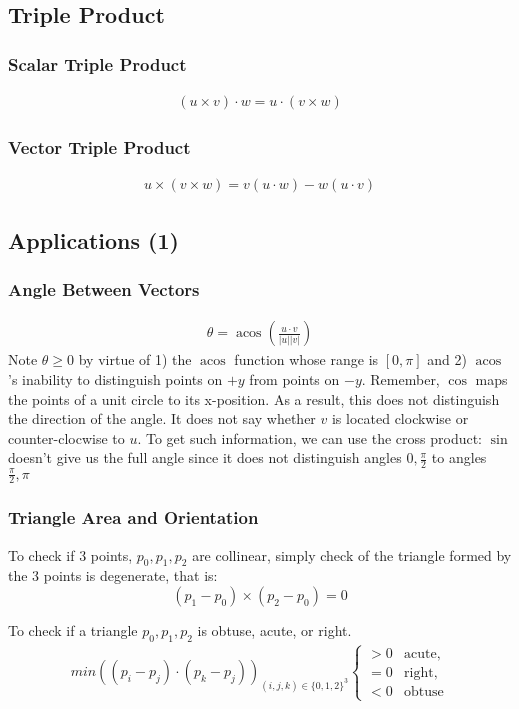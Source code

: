 \documentclass[12pt]{report}
\DeclareMathOperator{\acos}{acos}
\begin{document}
\subsection{Triple Product}
\subsubsection{Scalar Triple Product}
\begin{align}(u \times v) \cdot w = u \cdot (v \times w)\end{align}
\subsubsection{Vector Triple Product}
\begin{align}u \times (v \times w) = v(u \cdot w) - w(u \cdot v)\end{align}
\subsection{Applications (1)}
\subsubsection{Angle Between Vectors}
\begin{align}
	\theta = \acos\left(\frac{u \cdot v}{|u||v|}\right) 
\end{align}
Note $\theta \geq 0$ by virtue of 1) the $\acos$ function whose range is $[0, \pi]$ and 2) $\acos$'s inability to distinguish points on $+y$ from points on $-y$. Remember, $\cos$ maps the points of a unit circle to its x-position. As a result, this does not distinguish the direction of the angle. It does not say whether $v$ is located clockwise or counter-clocwise to $u$. To get such information, we can use the cross product:
$\sin$ doesn't give us the full angle since it does not distinguish angles $0, \frac{\pi}{2}$ to angles $\frac{\pi}{2}, \pi$
		
\subsubsection{Triangle Area and Orientation}
		
To check if 3 points, ${p_0, p_1, p_2}$ are collinear, simply check of the triangle formed by the 3 points is degenerate, that is:
$$
(p_1-p_0)\times (p_2-p_0) = 0
$$
		
To check if a triangle ${p_0, p_1, p_2}$ is obtuse, acute, or right.
\begin{align}
	min((p_i - p_j) \cdot (p_k - p_j))_{ (i,j,k) \in \{0,1,2\}^3}
	\begin{cases}
	> 0 & \text{acute}, \\
	= 0 & \text{right}, \\
	< 0 & \text{obtuse} 
	\end{cases}
\end{align}
		
\end{document}
